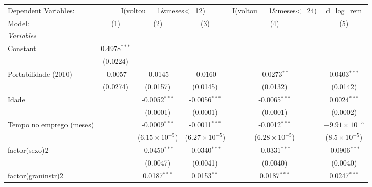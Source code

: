 
\begingroup
\centering
\begin{tabular}{lccccc}
   \tabularnewline \midrule \midrule
   Dependent Variables: & \multicolumn{3}{c}{I(voltou==1\&meses<=12)} & I(voltou==1\&meses<=24) & d\_log\_rem\\
   Model:                   & (1)                   & (2)                     & (3)                     & (4)                     & (5)\\  
   \midrule
   \emph{Variables}\\
   Constant                 & 0.4978$^{***}$        &                         &                         &                         &   \\   
                            & (0.0224)              &                         &                         &                         &   \\   
   Portabilidade (2010)     & -0.0057               & -0.0145                 & -0.0160                 & -0.0273$^{**}$          & 0.0403$^{***}$\\   
                            & (0.0274)              & (0.0157)                & (0.0145)                & (0.0132)                & (0.0142)\\   
   Idade                    &                       & -0.0052$^{***}$         & -0.0056$^{***}$         & -0.0065$^{***}$         & 0.0024$^{***}$\\   
                            &                       & (0.0001)                & (0.0001)                & (0.0001)                & (0.0002)\\   
   Tempo no emprego (meses) &                       & -0.0009$^{***}$         & -0.0011$^{***}$         & -0.0012$^{***}$         & $-9.91\times 10^{-5}$\\    
                            &                       & ($6.15\times 10^{-5}$)  & ($6.27\times 10^{-5}$)  & ($6.28\times 10^{-5}$)  & ($8.5\times 10^{-5}$)\\    
   factor(sexo)2            &                       & -0.0450$^{***}$         & -0.0340$^{***}$         & -0.0331$^{***}$         & -0.0906$^{***}$\\   
                            &                       & (0.0047)                & (0.0041)                & (0.0040)                & (0.0040)\\   
   factor(grauinstr)2       &                       & 0.0187$^{***}$          & 0.0153$^{**}$           & 0.0187$^{***}$          & 0.0247$^{***}$\\   

\end{tabular}
